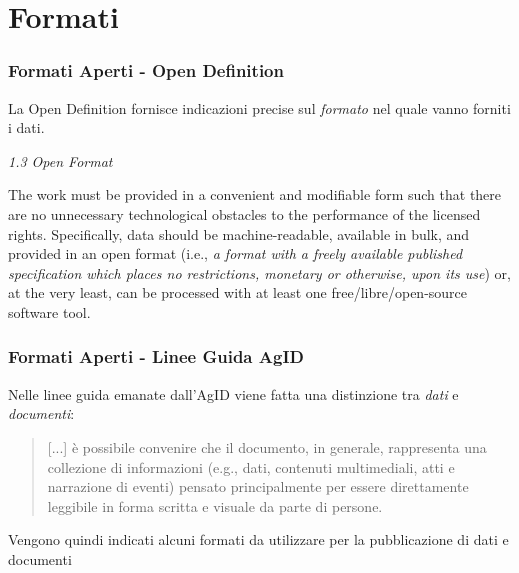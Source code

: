 \documentclass[8pt]{beamer}
\begin{document}
\section{Formati}
\begin{frame}
\frametitle{Formati Aperti - Open Definition}
La Open Definition fornisce indicazioni precise sul \emph{formato} nel quale vanno forniti i dati.
\vspace{\baselineskip}

\emph{1.3 Open Format}
\vspace{\baselineskip}

The work must be provided in a convenient and modifiable form such that there are no unnecessary 
technological obstacles to the performance of the licensed rights. Specifically, data should be machine-readable, 
available in bulk, and provided in an open format (i.e., \emph{a format with a freely available published specification 
which places no restrictions, monetary or otherwise, upon its use}) or, at the very least, 
can be processed with at least one free/libre/open-source software tool.
\vspace{\baselineskip}

\end{frame}

\begin{frame}
\frametitle{Formati Aperti - Linee Guida AgID}

Nelle linee guida emanate dall'AgID viene fatta una distinzione tra \emph{dati} e
\emph{documenti}:

\begin{quote}
[...] \`e possibile convenire che il documento, in generale, rappresenta una
collezione di informazioni (e.g., dati, contenuti multimediali, atti e narrazione di eventi) pensato
principalmente per essere direttamente leggibile in forma scritta e visuale da parte di persone.
\end{quote}
\vspace{\baselineskip}

Vengono quindi indicati alcuni formati da utilizzare per la pubblicazione di dati e documenti
\end{frame}
\end{document}
